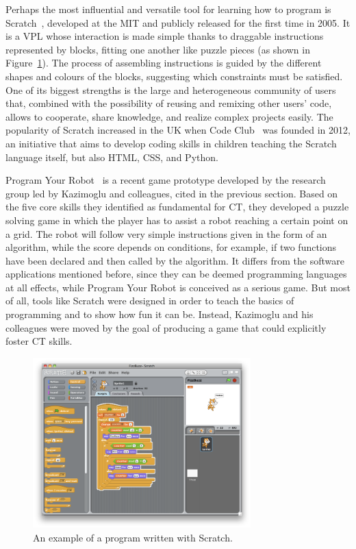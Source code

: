 Perhaps the most influential and versatile tool for learning how to program is Scratch~\cite{Resnick:2009bd}, developed at the MIT and publicly released for the first time in 2005. It is a \ac{VPL} whose interaction is made simple thanks to draggable instructions represented by blocks, fitting one another like puzzle pieces (as shown in Figure~\ref{fig:scratch}). The process of assembling instructions is guided by the different shapes and colours of the blocks, suggesting which constraints must be satisfied. One of its biggest strengths is the large and heterogeneous community of users that, combined with the possibility of reusing and remixing other users' code, allows to cooperate, share knowledge, and realize complex projects easily. The popularity of Scratch increased in the UK when Code Club~\cite{CODECLUB} was founded in 2012, an initiative that aims to develop coding skills in children teaching the Scratch language itself, but also HTML, CSS, and Python.

Program Your Robot~\cite{kazimoglu2012serious} is a recent game prototype developed by the research group led by Kazimoglu and colleagues, cited in the previous section. Based on the five core skills they identified as fundamental for \ac{CT}, they developed a puzzle solving game in which the player has to assist a robot reaching a certain point on a grid. The robot will follow very simple instructions given in the form of an algorithm, while the score depends on conditions, for example, if two functions have been declared and then called by the algorithm. It differs from the software applications mentioned before, since they can be deemed programming languages at all effects, while Program Your Robot is conceived as a serious game. But most of all, tools like Scratch were designed in order to teach the basics of programming and to show how fun it can be. Instead, Kazimoglu and his colleagues were moved by the goal of producing a game that could explicitly foster \ac{CT} skills.
\begin{figure}[ht!]
  \centering
  \includegraphics[width=0.75\textwidth]{images/c2/Scratch.png} 
  \caption{An example of a program written with Scratch.}\label{fig:scratch}
\end{figure}

